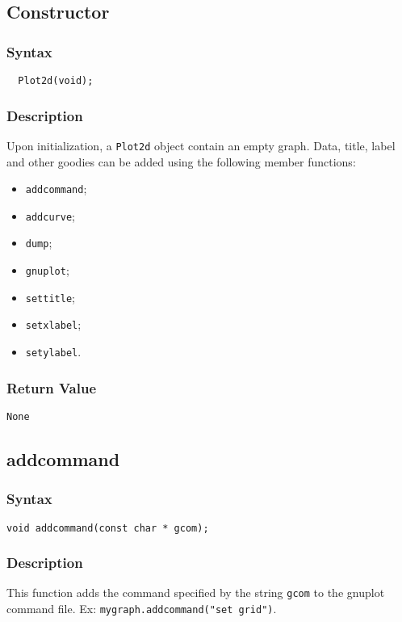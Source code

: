 \documentclass[dvips,11pt,fleqn]{report}
\begin{document}
\subsection*{Constructor}
 \subsubsection*{Syntax}
 \begin{verbatim}
  Plot2d(void);
 \end{verbatim}

 \subsubsection*{Description}   
 Upon initialization, a {\tt Plot2d} object contain an empty graph.
 Data, title, label and other goodies can be added using the following
 member functions:
\begin{itemize}
\item {\tt addcommand};
\item {\tt addcurve};
\item {\tt dump};
\item {\tt gnuplot};
\item {\tt settitle};
\item {\tt setxlabel};
\item {\tt setylabel}.
\end{itemize}


\subsubsection*{Return Value}

{\tt None}
\newpage

\subsection*{addcommand}
\subsubsection*{Syntax}
\begin{verbatim}
void addcommand(const char * gcom);
\end{verbatim}
\subsubsection*{Description}
This function adds the command specified by the string {\tt gcom} to 
the \textsf{gnuplot} command file. Ex: {\tt mygraph.addcommand("set grid")}.
\end{document}
